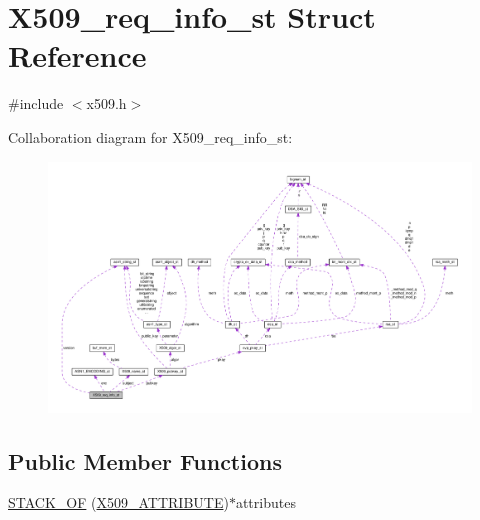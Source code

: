 \hypertarget{struct_x509__req__info__st}{}\section{X509\+\_\+req\+\_\+info\+\_\+st Struct Reference}
\label{struct_x509__req__info__st}


{\ttfamily \#include $<$x509.\+h$>$}



Collaboration diagram for X509\+\_\+req\+\_\+info\+\_\+st\+:
\nopagebreak
\begin{figure}[H]
\begin{center}
\leavevmode
\includegraphics[width=350pt]{struct_x509__req__info__st__coll__graph}
\end{center}
\end{figure}
\subsection*{Public Member Functions}
\begin{DoxyCompactItemize}
\item 
\hyperlink{struct_x509__req__info__st_a18ba0baed242babc92f28c0c80b29214}{S\+T\+A\+C\+K\+\_\+\+OF} (\hyperlink{x509_8h_aa4f1a62a9d2dd8cb6780fe2713737c0f}{X509\+\_\+\+A\+T\+T\+R\+I\+B\+U\+TE})$\ast$attributes
\end{DoxyCompactItemize}
